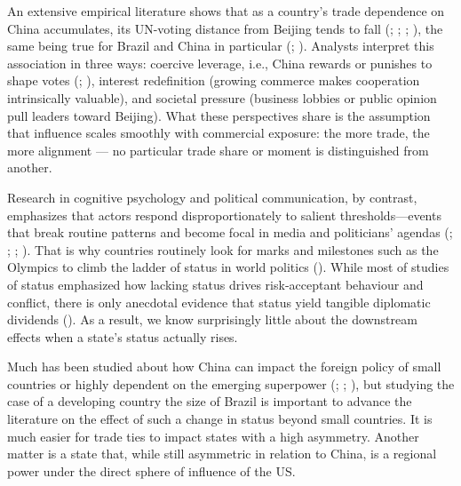\documentclass[
  12pt,
]{article}
\begin{document}
An extensive empirical literature shows that as a country's trade
dependence on China accumulates, its UN-voting distance from Beijing
tends to fall (; ;
;
),
the same being true for Brazil and China in particular
(;
). Analysts
interpret this association in three ways: coercive leverage, i.e., China
rewards or punishes to shape votes (; ), interest redefinition
(growing commerce makes cooperation intrinsically valuable), and
societal pressure (business lobbies or public opinion pull leaders
toward Beijing). What these perspectives share is the assumption that
influence scales smoothly with commercial exposure: the more trade, the
more alignment --- no particular trade share or moment is distinguished
from another.

Research in cognitive psychology and political communication, by
contrast, emphasizes that actors respond disproportionately to salient
thresholds---events that break routine patterns and become focal in
media and politicians' agendas
(;
;
;
). That is why
countries routinely look for marks and milestones such as the Olympics
to climb the ladder of status in world politics
(). While most of studies of
status emphasized how lacking status drives risk‑acceptant behaviour and
conflict, there is only anecdotal evidence that status yield tangible
diplomatic dividends (). As a result,
we know surprisingly little about the downstream effects when a state's
status actually rises.

Much has been studied about how China can impact the foreign policy of
small countries or highly dependent on the emerging superpower
(;
;
),
but studying the case of a developing country the size of Brazil is
important to advance the literature on the effect of such a change in
status beyond small countries. It is much easier for trade ties to
impact states with a high asymmetry. Another matter is a state that,
while still asymmetric in relation to China, is a regional power under
the direct sphere of influence of the US.
\end{document}
